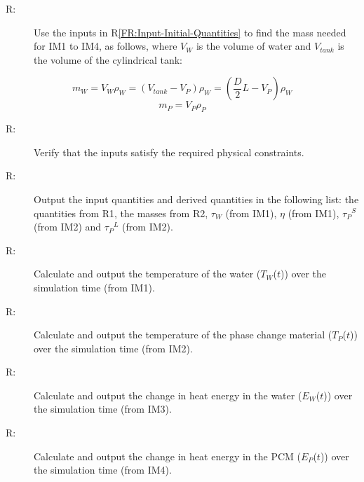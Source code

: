 \documentclass[12pt]{article}
\newcounter{reqnum}
\newcommand{\rthereqnum}{R\thereqnum}
\begin{document}
\begin{description}
\item[\rthereqnum\label{FR:Use-Above-Find-Mass-IM1-IM4}:]Use the inputs in R\ref{FR:Input-Initial-Quantities} to find the mass needed for IM1 to IM4, as follows, where ${V_{W}}$ is the volume of water and ${V_{tank}}$ is the volume of the cylindrical tank:
\end{description}
\begin{dmath}
{m_{W}}={V_{W}} {ρ_{W}}=\left({V_{tank}}-{V_{P}}\right) {ρ_{W}}=\left(\frac{D}{2} L-{V_{P}}\right) {ρ_{W}}
\end{dmath}
\begin{dmath}
{m_{P}}={V_{P}} {ρ_{P}}
\end{dmath}
\begin{description}
\item[\rthereqnum\label{FR:req3}:]Verify that the inputs satisfy the required physical constraints.
\end{description}
\begin{description}
\item[\rthereqnum\label{FR:Output-Input-Derived-Quantities}:]Output the input quantities and derived quantities in the following list: the quantities from R1, the masses from R2, ${τ_{W}}$ (from IM1), $η$ (from IM1), ${{τ_{P}}^{S}}$ (from IM2) and ${{τ_{P}}^{L}}$ (from IM2).
\end{description}
\begin{description}
\item[\rthereqnum\label{FR:Calculate-Temperature-Water-OverTime}:]Calculate and output the temperature of the water (${T_{W}}$($t$)) over the simulation time (from IM1).
\end{description}
\begin{description}
\item[\rthereqnum\label{FR:Calculate-Temperature-PCM-Over-Time}:]Calculate and output the temperature of the phase change material (${T_{P}}$($t$)) over the simulation time (from IM2).
\end{description}
\begin{description}
\item[\rthereqnum\label{FR:req7}:]Calculate and output the change in heat energy in the water (${E_{W}}$($t$)) over the simulation time (from IM3).
\end{description}
\begin{description}
\item[\rthereqnum\label{FR:req8}:]Calculate and output the change in heat energy in the PCM (${E_{P}}$($t$)) over the simulation time (from IM4).
\end{description}
\end{document}
